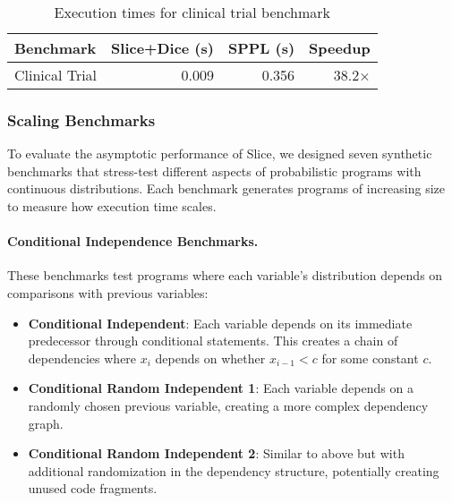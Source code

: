 \begin{table}[!t]
\centering
\begin{tabular}{lrrr}
\toprule
Benchmark & Slice+Dice (s) & SPPL (s) & Speedup \\
\midrule
Clinical Trial & 0.009 & 0.356 & 38.2× \\
\bottomrule
\end{tabular}
\caption{Execution times for clinical trial benchmark}
\end{table}

\subsubsection{Scaling Benchmarks}

To evaluate the asymptotic performance of Slice, we designed seven synthetic benchmarks that stress-test different aspects of probabilistic programs with continuous distributions. Each benchmark generates programs of increasing size to measure how execution time scales.

\paragraph{Conditional Independence Benchmarks.} 
These benchmarks test programs where each variable's distribution depends on comparisons with previous variables:
\begin{itemize}
\item \textbf{Conditional Independent}: Each variable depends on its immediate predecessor through conditional statements. This creates a chain of dependencies where $x_i$ depends on whether $x_{i-1} < c$ for some constant $c$.
\item \textbf{Conditional Random Independent 1}: Each variable depends on a randomly chosen previous variable, creating a more complex dependency graph.
\item \textbf{Conditional Random Independent 2}: Similar to above but with additional randomization in the dependency structure, potentially creating unused code fragments.
\end{itemize}



